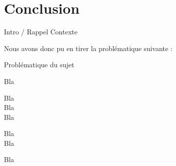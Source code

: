 \chapter{Conclusion}

Intro / Rappel Contexte

Nous avons donc pu en tirer la problématique suivante :

\begin{center}
\hskip7mm
Problématique du sujet
\end{center}

Bla

Bla\\

Bla\\

Bla

Bla\\

Bla

Bla
